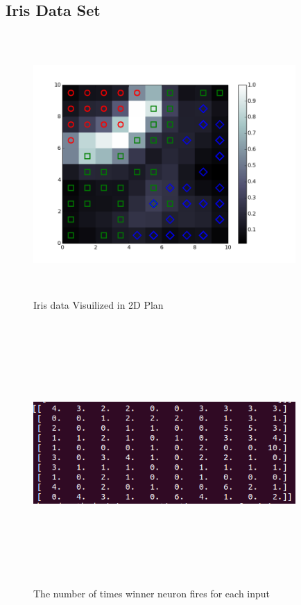 \documentclass{article}
\begin{document}
\subsection{Iris Data Set}

\begin{figure}
  \centering
  \includegraphics[height=10cm, width=10cm]{i4.png}
  \caption{Iris data Visuilized in 2D Plan}
\end{figure}

\begin{figure}
  \centering
  \includegraphics[height=10cm, width=10cm]{i5.png}
  \caption{The number of times winner neuron fires for each input}
\end{figure}
\end{document}
